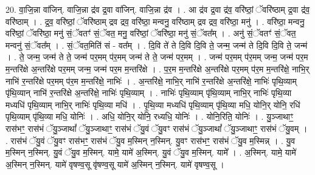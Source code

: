\documentclass[17pt]{extarticle}
\begin{document}
20. वा॒जि॒न्ना वा॑जिन्. वाजि॒न्ना द्र॑व द्र॒वा वा॑जिन्. वाजि॒न्ना द्र॑व । . आ द्र॑व द्र॒वा द्र॑व॒ वरि॑ष्ठां॒ ॅवरि॑ष्ठाम् द्र॒वा द्र॑व॒ वरि॑ष्ठाम् । . द्र॒व॒ वरि॑ष्ठां॒ ॅवरि॑ष्ठाम् द्रव द्रव॒ वरि॑ष्ठा॒ मन्वनु॒ वरि॑ष्ठाम् द्रव द्रव॒ वरि॑ष्ठा॒ मनु॑ । . वरि॑ष्ठा॒ मन्वनु॒ वरि॑ष्ठां॒ ॅवरि॑ष्ठा॒ मनु॑ सं॒ॅवतꣳ॑ सं॒ॅवत॒ मनु॒ वरि॑ष्ठां॒ ॅवरि॑ष्ठा॒ मनु॑ सं॒ॅवत᳚म् । . अनु॑ सं॒ॅवतꣳ॑ सं॒ॅवत॒ मन्वनु॑ सं॒ॅवत᳚म् । . सं॒ॅवत॒मिति॑ सं - वत᳚म् । . दि॒वि ते॑ ते दि॒वि दि॒वि ते॒ जन्म॒ जन्म॑ ते दि॒वि दि॒वि ते॒ जन्म॑ । . ते॒ जन्म॒ जन्म॑ ते ते॒ जन्म॑ पर॒मम् प॑र॒मम् जन्म॑ ते ते॒ जन्म॑ पर॒मम् । . जन्म॑ पर॒मम् प॑र॒मम् जन्म॒ जन्म॑ पर॒म म॒न्तरि॑क्षे अ॒न्तरि॑क्षे पर॒मम् जन्म॒ जन्म॑ पर॒म म॒न्तरि॑क्षे । . प॒र॒म म॒न्तरि॑क्षे अ॒न्तरि॑क्षे पर॒मम् प॑र॒म म॒न्तरि॑क्षे॒ नाभि॒र् नाभि॑ र॒न्तरि॑क्षे पर॒मम् प॑र॒म म॒न्तरि॑क्षे॒ नाभिः॑ । . अ॒न्तरि॑क्षे॒ नाभि॒र् नाभि॑ र॒न्तरि॑क्षे अ॒न्तरि॑क्षे॒ नाभिः॑ पृथि॒व्याम् पृ॑थि॒व्यान् नाभि॑ र॒न्तरि॑क्षे अ॒न्तरि॑क्षे॒ नाभिः॑ पृथि॒व्याम् । . नाभिः॑ पृथि॒व्याम् पृ॑थि॒व्याम् नाभि॒र् नाभिः॑ पृथि॒व्या मध्यधि॑ पृथि॒व्याम् नाभि॒र् नाभिः॑ पृथि॒व्या मधि॑ । . पृ॒थि॒व्या मध्यधि॑ पृथि॒व्याम् पृ॑थि॒व्या मधि॒ योनि॒र् योनि॒ रधि॑ पृथि॒व्याम् पृ॑थि॒व्या मधि॒ योनिः॑ । . अधि॒ योनि॒र् योनि॒ रध्यधि॒ योनिः॑ । . योनि॒रिति॒ योनिः॑ । . यु॒ञ्जाथाꣳ॒॒ रास॑भꣳ॒॒ रास॑भं ॅयु॒ञ्जाथां᳚ ॅयु॒ञ्जाथाꣳ॒॒ रास॑भं ॅयु॒वं ॅयु॒वꣳ रास॑भं ॅयु॒ञ्जाथां᳚ ॅयु॒ञ्जाथाꣳ॒॒ रास॑भं ॅयु॒वम् । . रास॑भं ॅयु॒वं ॅयु॒वꣳ रास॑भꣳ॒॒ रास॑भं ॅयु॒व म॒स्मिन् न॒स्मिन्. यु॒वꣳ रास॑भꣳ॒॒ रास॑भं ॅयु॒व म॒स्मिन्न् । . यु॒व म॒स्मिन् न॒स्मिन्. यु॒वं ॅयु॒व म॒स्मिन्. यामे॒ यामे॑ अ॒स्मिन्. यु॒वं ॅयु॒व म॒स्मिन्. यामे᳚ । . अ॒स्मिन्. यामे॒ यामे॑ अ॒स्मिन् न॒स्मिन्. यामे॑ वृषण्व॒सू वृ॑षण्व॒सू यामे॑ अ॒स्मिन् न॒स्मिन्. यामे॑ वृषण्व॒सू । \newline
\end{document}
